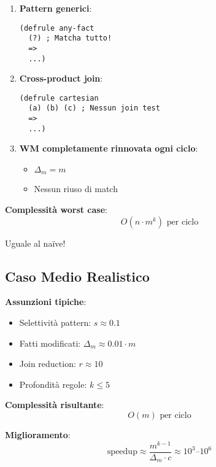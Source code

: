 \begin{enumerate}
\item \textbf{Pattern generici}:
\begin{lstlisting}[language=CLIPS]
(defrule any-fact
  (?) ; Matcha tutto!
  =>
  ...)
\end{lstlisting}

\item \textbf{Cross-product join}:
\begin{lstlisting}[language=CLIPS]
(defrule cartesian
  (a) (b) (c) ; Nessun join test
  =>
  ...)
\end{lstlisting}

\item \textbf{WM completamente rinnovata ogni ciclo}:
\begin{itemize}
\item $\Delta_m = m$
\item Nessun riuso di match
\end{itemize}

\end{enumerate}

\textbf{Complessità worst case}:
\begin{equation}
O(n \cdot m^k) \text{ per ciclo}
\end{equation}

Uguale al naïve!

\subsection{Caso Medio Realistico}

\textbf{Assunzioni tipiche}:
\begin{itemize}
\item Selettività pattern: $s \approx 0.1$
\item Fatti modificati: $\Delta_m \approx 0.01 \cdot m$
\item Join reduction: $r \approx 10$
\item Profondità regole: $k \leq 5$
\end{itemize}

\textbf{Complessità risultante}:
\begin{equation}
O(m) \text{ per ciclo}
\end{equation}

\textbf{Miglioramento}:
\begin{equation}
\text{speedup} \approx \frac{m^{k-1}}{\Delta_m \cdot c} \approx 10^3 \text{--} 10^6
\end{equation}

